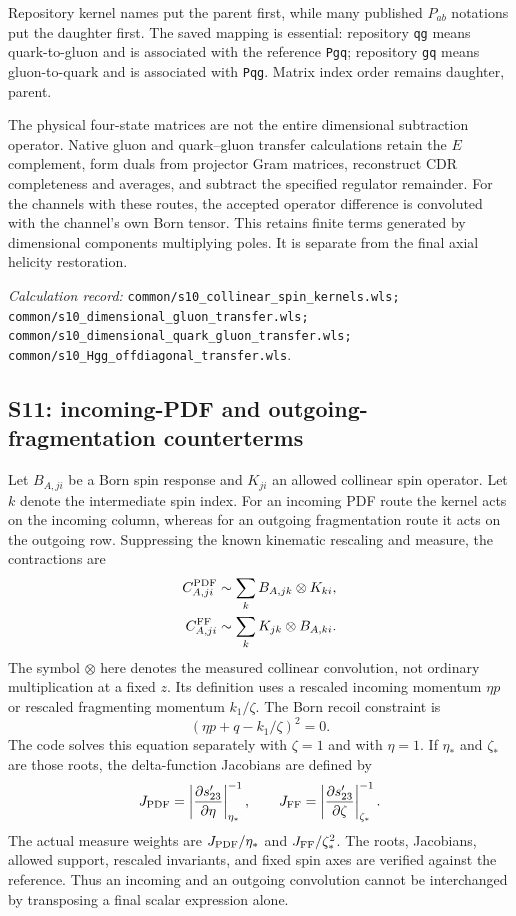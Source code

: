 \documentclass[11pt,a4paper]{article}
\newcommand{\code}[1]{{\small\nolinkurl{#1}}}
\newcommand{\pathref}[1]{\par{\footnotesize\textit{Calculation record:} \code{#1}.}\par}
\begin{document}
Repository kernel names put the parent first, while many published $P_{ab}$ notations put the daughter first. The saved mapping is essential: repository \code{qg} means quark-to-gluon and is associated with the reference \code{Pgq}; repository \code{gq} means gluon-to-quark and is associated with \code{Pqg}. Matrix index order remains daughter, parent.

The physical four-state matrices are not the entire dimensional subtraction operator. Native gluon and quark--gluon transfer calculations retain the $E$ complement, form duals from projector Gram matrices, reconstruct CDR completeness and averages, and subtract the specified regulator remainder. For the channels with these routes, the accepted operator difference is convoluted with the channel's own Born tensor. This retains finite terms generated by dimensional components multiplying poles. It is separate from the final axial helicity restoration.
\pathref{common/s10_collinear_spin_kernels.wls; common/s10_dimensional_gluon_transfer.wls; common/s10_dimensional_quark_gluon_transfer.wls; common/s10_Hgg_offdiagonal_transfer.wls}

\subsection{S11: incoming-PDF and outgoing-fragmentation counterterms}
Let $B_{A,ji}$ be a Born spin response and $K_{ji}$ an allowed collinear spin operator. Let $k$ denote the intermediate spin index. For an incoming PDF route the kernel acts on the incoming column, whereas for an outgoing fragmentation route it acts on the outgoing row. Suppressing the known kinematic rescaling and measure, the contractions are
\begin{align}
 C^{\rm PDF}_{A,ji}&\sim\sum_k B_{A,jk}\otimes K_{ki},\\
 C^{\rm FF}_{A,ji}&\sim\sum_k K_{jk}\otimes B_{A,ki}.
\end{align}
The symbol $\otimes$ here denotes the measured collinear convolution, not ordinary multiplication at a fixed $z$. Its definition uses a rescaled incoming momentum $\eta p$ or rescaled fragmenting momentum $k_1/\zeta$. The Born recoil constraint is
\begin{equation}
 (\eta p+q-k_1/\zeta)^2=0.
\end{equation}
The code solves this equation separately with $\zeta=1$ and with $\eta=1$. If $\eta_*$ and $\zeta_*$ are those roots, the delta-function Jacobians are defined by
\begin{equation}
 J_{\rm PDF}=\left|\frac{\partial s'_{23}}{\partial\eta}\right|_{\eta_*}^{-1},
 \qquad
 J_{\rm FF}=\left|\frac{\partial s'_{23}}{\partial\zeta}\right|_{\zeta_*}^{-1}.
\end{equation}
The actual measure weights are $J_{\rm PDF}/\eta_*$ and $J_{\rm FF}/\zeta_*^2$. The roots, Jacobians, allowed support, rescaled invariants, and fixed spin axes are verified against the reference. Thus an incoming and an outgoing convolution cannot be interchanged by transposing a final scalar expression alone.
\end{document}

